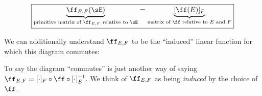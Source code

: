\begin{theorem}
    \begin{align*}
        \boxed
        {
            \underbrace{\ff_{E,F}(\sE)}_{\text{primitive matrix of $\ff_{E,F}$ relative to $\sE$}}
            =
            \underbrace{[\ff(E)]_F}_{\text{matrix of $\ff$ relative to $E$ and $F$}}
        }
    \end{align*}

    We can additionally understand $\ff_{E,F}$ to be the ``induced'' linear function for which this diagram commutes:
    
    \begin{center}
    \end{center}
        
    To say the diagram ``commutes'' is just another way of saying $\ff_{E,F} = [\cdot]_F \circ \ff \circ [\cdot]_E^{-1}$. We think of $\ff_{E,F}$ as being \textit{induced} by the choice of $\ff$.
    
        
\end{theorem}

